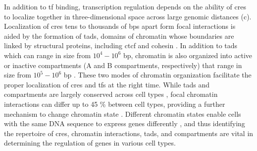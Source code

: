 In addition to \gls{tf} binding, transcription regulation depends on the ability of \glspl{cre} to localize together in three-dimensional space across large genomic distances \cite{zhuTranscriptionFactorsReaders2016,fureyChIPSeqNew2012,carterEpigeneticBasisCellular2021} (c).
Localization of \glspl{cre} tens to thousands of \glspl{bp} apart form focal interactions is aided by the formation of \glspl{tad}, domains of chromatin whose boundaries are linked by structural proteins, including \gls{ctcf} and cohesin \cite{zhouChartingHistoneModifications2011,dekker3DGenomeModerator2016,finnMolecularBasisBiological2019,oudelaarRelationshipGenomeStructure2020}.
In addition to \glspl{tad} which can range in size from $10^4 - 10^6$ \gls{bp}, chromatin is also organized into active or inactive compartments (A and B compartments, respectively) that range in size from $10^5 - 10^6$ \gls{bp} \cite{lieberman-aidenComprehensiveMappingLongRange2009,rao3DMapHuman2014,oudelaarRelationshipGenomeStructure2020,mirnyTwoMajorMechanisms2019}.
These two modes of chromatin organization facilitate the proper localization of \glspl{cre} and \glspl{tf} at the right time.
While \glspl{tad} and compartments are largely conserved across cell types \cite{dixonTopologicalDomainsMammalian2012,stergachisConservationTransactingCircuitry2014,berthelotComplexityConservationRegulatory2017}, focal chromatin interactions can differ up to 45 \% between cell types, providing a further mechanism to change chromatin state \cite{rao3DMapHuman2014}.
Different chromatin states enable cells with the same DNA sequence to express genes differently \cite{spurrellTiesThatBind2016,buenrostroSinglecellChromatinAccessibility2015,leeTranscriptionalRegulationIts2013,ongEnhancerFunctionNew2011,schoenfelderLongrangeEnhancerPromoter2019,zhouChartingHistoneModifications2011}, and thus identifying the repertoire of \glspl{cre}, chromatin interactions, \glspl{tad}, and compartments are vital in determining the regulation of genes in various cell types.



